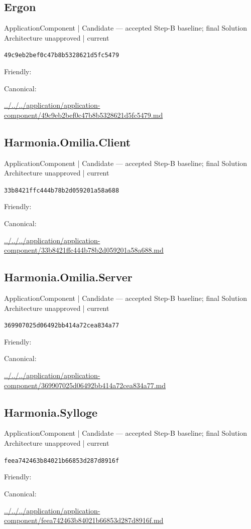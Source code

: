 \documentclass[10pt,a4paper]{article}
\begin{document}
\subsection*{Ergon}
{\small ApplicationComponent | Candidate — accepted Step-B baseline; final Solution Architecture unapproved | current}\par
\texttt{49c9eb2bef0c47b8b5328621d5fc5479}\par
Friendly: \par
Canonical: \par
{\footnotesize\url{../../../application/application-component/49c9eb2bef0c47b8b5328621d5fc5479.md}}\par
\subsection*{Harmonia.Omilia.Client}
{\small ApplicationComponent | Candidate — accepted Step-B baseline; final Solution Architecture unapproved | current}\par
\texttt{33b8421ffc444b78b2d059201a58a688}\par
Friendly: \par
Canonical: \par
{\footnotesize\url{../../../application/application-component/33b8421ffc444b78b2d059201a58a688.md}}\par
\subsection*{Harmonia.Omilia.Server}
{\small ApplicationComponent | Candidate — accepted Step-B baseline; final Solution Architecture unapproved | current}\par
\texttt{369907025d06492bb414a72cea834a77}\par
Friendly: \par
Canonical: \par
{\footnotesize\url{../../../application/application-component/369907025d06492bb414a72cea834a77.md}}\par
\subsection*{Harmonia.Sylloge}
{\small ApplicationComponent | Candidate — accepted Step-B baseline; final Solution Architecture unapproved | current}\par
\texttt{feea742463b84021b66853d287d8916f}\par
Friendly: \par
Canonical: \par
{\footnotesize\url{../../../application/application-component/feea742463b84021b66853d287d8916f.md}}\par
\end{document}
